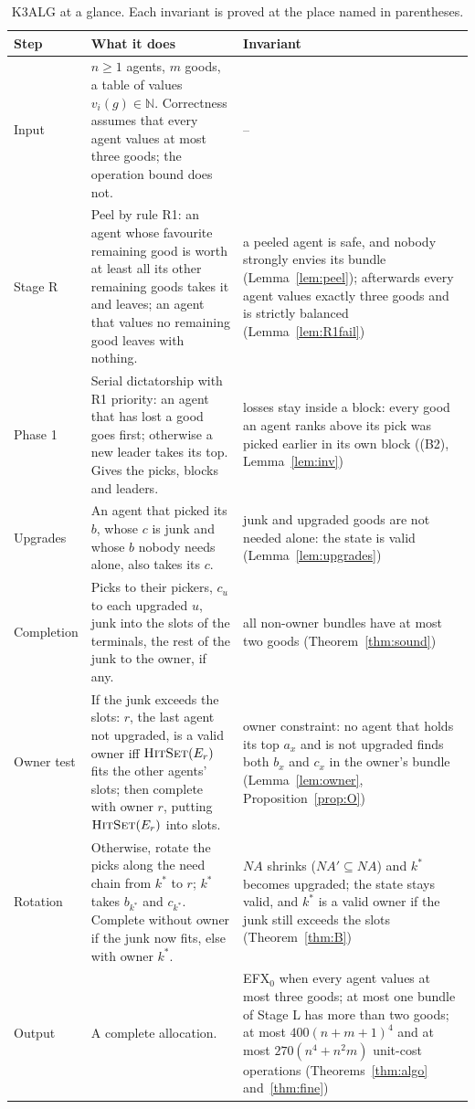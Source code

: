 \documentclass[runningheads,11pt]{llncs}
\newcommand{\efxz}{\texorpdfstring{\mbox{EFX$_0$}}{EFX0}}
\newcommand{\NA}{\mathit{NA}}
\newcommand{\HitSet}{\textup{\textsc{HitSet}}}
\begin{document}
\begin{table}[tbp]
\caption{K3ALG at a glance. Each invariant is proved at the place named in parentheses.}\label{tab:glance}
\centering\small
\setlength{\tabcolsep}{4pt}\begin{tabular}{@{}>{\raggedright\arraybackslash}p{}>{\raggedright\arraybackslash}p{}>{\raggedright\arraybackslash}p{}@{}}
\toprule
Step & What it does & Invariant \\
\midrule
Input & $n\ge1$ agents, $m$ goods, a table of values $v_i(g)\in\mathbb{N}$. Correctness assumes that every agent values at most three goods; the operation bound does not. & -- \\
Stage R & Peel by rule R1: an agent whose favourite remaining good is worth at least all its other remaining goods takes it and leaves; an agent that values no remaining good leaves with nothing. & a peeled agent is safe, and nobody strongly envies its bundle (Lemma~\ref{lem:peel}); afterwards every agent values exactly three goods and is strictly balanced (Lemma~\ref{lem:R1fail}) \\
Phase 1 & Serial dictatorship with R1 priority: an agent that has lost a good goes first; otherwise a new leader takes its top. Gives the picks, blocks and leaders. & losses stay inside a block: every good an agent ranks above its pick was picked earlier in its own block ((B2), Lemma~\ref{lem:inv}) \\
Upgrades & An agent that picked its $b$, whose $c$ is junk and whose $b$ nobody needs alone, also takes its $c$. & junk and upgraded goods are not needed alone: the state is valid (Lemma~\ref{lem:upgrades}) \\
Completion & Picks to their pickers, $c_u$ to each upgraded $u$, junk into the slots of the terminals, the rest of the junk to the owner, if any. & all non-owner bundles have at most two goods (Theorem~\ref{thm:sound}) \\
Owner test & If the junk exceeds the slots: $r$, the last agent not upgraded, is a valid owner iff $\HitSet(E_r)$ fits the other agents' slots; then complete with owner $r$, putting $\HitSet(E_r)$ into slots. & owner constraint: no agent that holds its top $a_x$ and is not upgraded finds both $b_x$ and $c_x$ in the owner's bundle (Lemma~\ref{lem:owner}, Proposition~\ref{prop:O}) \\
Rotation & Otherwise, rotate the picks along the need chain from $k^*$ to $r$; $k^*$ takes $b_{k^*}$ and $c_{k^*}$. Complete without owner if the junk now fits, else with owner $k^*$. & $\NA$ shrinks ($\NA'\subseteq\NA$) and $k^*$ becomes upgraded; the state stays valid, and $k^*$ is a valid owner if the junk still exceeds the slots (Theorem~\ref{thm:B}) \\
Output & A complete allocation. & \efxz{} when every agent values at most three goods; at most one bundle of Stage L has more than two goods; at most $400(n+m+1)^4$ and at most $270(n^4+n^2m)$ unit-cost operations (Theorems~\ref{thm:algo} and~\ref{thm:fine}) \\
\bottomrule
\end{tabular}
\end{table}
\end{document}
